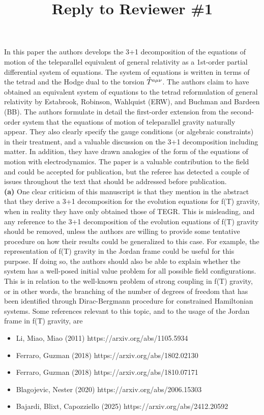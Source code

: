 \documentclass[3p,times]{article}
\title{Reply to Reviewer \#1}
\newcommand{\HDT}[1]{\accentset{\star}{T}^{#1}}
\begin{document}
\maketitle

\noindent
In this paper the authors develops the 3+1 decomposition of the equations of
motion of the teleparallel equivalent of general relativity as a 1st-order
partial differential system of equations. The system of equations is written in
terms of the tetrad and the Hodge dual to the torsion $\HDT{a\mu\nu}$. The
authors claim to have obtained an equivalent system of equations to the tetrad
reformulation of general relativity by Estabrook, Robinson, Wahlquist (ERW), and
Buchman and Bardeen (BB). The authors formulate in detail the first-order
extension from the second-order system that the equations of motion of
teleparallel gravity naturally appear. They also clearly specify the gauge
conditions (or algebraic constraints) in their treatment, and a valuable
discussion on the 3+1 decomposition including matter. In addition, they have
drawn analogies of the form of the equations of motion with electrodynamics. The
paper is a valuable contribution to the field and could be accepted for
publication, but the referee has detected a couple of issues throughout the text
that should be addressed before publication.
\\

\noindent
\textbf{(a)} One clear criticism of this manuscript is that they mention in the abstract
that they derive a 3+1 decomposition for the evolution equations for f(T)
gravity, when in reality they have only obtained those of TEGR. This is
misleading, and any reference to the 3+1 decomposition of the evolution
equations of f(T) gravity should be removed, unless the authors are willing to
provide some tentative procedure on how their results could be generalized to
this case. For example, the representation of f(T) gravity in the Jordan frame
could be useful for this purpose. If doing so, the authors should also be able
to explain whether the system has a well-posed initial value problem for all
possible field configurations. This is in relation to the well-known problem of
strong coupling in f(T) gravity, or in other words, the branching of the number
of degrees of freedom that has been identified through Dirac-Bergmann procedure
for constrained Hamiltonian systems. Some references relevant to this topic, and
to the usage of the Jordan frame in f(T) gravity, are

\begin{itemize}
    \item 
    Li, Miao, Miao (2011) https://arxiv.org/abs/1105.5934
    \item 
    Ferraro, Guzman (2018) https://arxiv.org/abs/1802.02130
   \item 
    Ferraro, Guzman (2018) https://arxiv.org/abs/1810.07171
   \item 
    Blagojevic, Nester (2020) https://arxiv.org/abs/2006.15303
   \item 
    Bajardi, Blixt, Capozziello (2025) https://arxiv.org/abs/2412.20592
\end{itemize}
\end{document}
